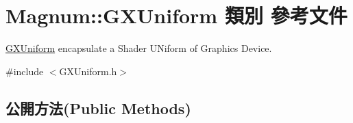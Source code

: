 \hypertarget{class_magnum_1_1_g_x_uniform}{}\section{Magnum\+:\+:G\+X\+Uniform 類別 參考文件}
\label{class_magnum_1_1_g_x_uniform}


\hyperlink{class_magnum_1_1_g_x_uniform}{G\+X\+Uniform} encapsulate a Shader U\+Niform of Graphics Device.  




{\ttfamily \#include $<$G\+X\+Uniform.\+h$>$}

\subsection*{公開方法(Public Methods)}
